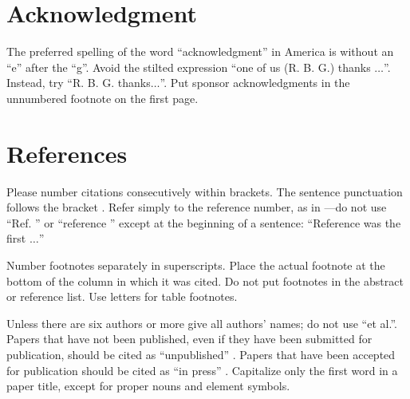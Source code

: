 \documentclass[conference]{IEEEtran}
\begin{document}
\section*{Acknowledgment}

The preferred spelling of the word ``acknowledgment'' in America is without 
an ``e'' after the ``g''. Avoid the stilted expression ``one of us (R. B. 
G.) thanks $\ldots$''. Instead, try ``R. B. G. thanks$\ldots$''. Put sponsor 
acknowledgments in the unnumbered footnote on the first page.

\section*{References}

Please number citations consecutively within brackets. The 
sentence punctuation follows the bracket \cite{b2}. Refer simply to the reference 
number, as in \cite{b3}---do not use ``Ref. \cite{b3}'' or ``reference \cite{b3}'' except at 
the beginning of a sentence: ``Reference \cite{b3} was the first $\ldots$''

Number footnotes separately in superscripts. Place the actual footnote at 
the bottom of the column in which it was cited. Do not put footnotes in the 
abstract or reference list. Use letters for table footnotes.

Unless there are six authors or more give all authors' names; do not use 
``et al.''. Papers that have not been published, even if they have been 
submitted for publication, should be cited as ``unpublished'' \cite{b4}. Papers 
that have been accepted for publication should be cited as ``in press'' \cite{b5}. 
Capitalize only the first word in a paper title, except for proper nouns and 
element symbols.
\end{document}
